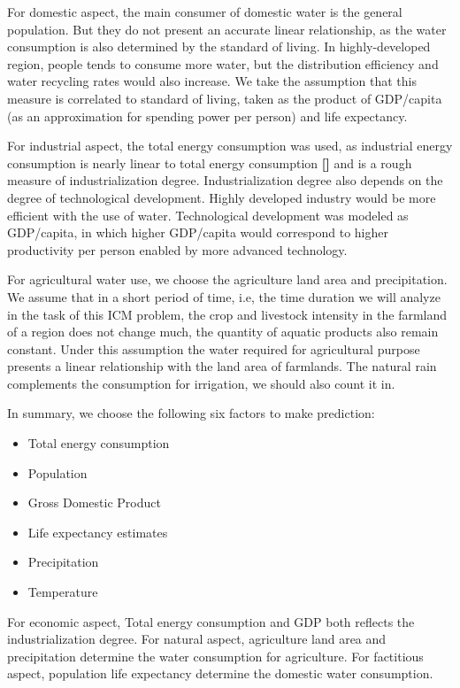 \documentclass{mcmthesis}
\begin{document}
For domestic aspect, the main consumer of domestic water is the general population. But they do not present an accurate linear relationship, as the water consumption is also determined by the standard of living. In highly-developed region, people tends to consume more water, but the distribution efficiency and water recycling rates would also increase. We take the assumption that this measure is correlated to standard of living, taken as the product of GDP/capita (as an approximation for spending power per person) and life expectancy. %

For industrial aspect, the total energy consumption was used, as industrial energy consumption is nearly linear to total energy consumption \textbf{[]} and is a rough measure of industrialization degree. Industrialization degree also depends on the degree of technological development. Highly developed industry would be more efficient with the use of water. Technological development was modeled as GDP/capita, in which higher GDP/capita would correspond to higher productivity per person enabled by more advanced technology.  %

For agricultural water use, we choose the agriculture land area and  precipitation. We assume that in a short period of time, i.e, the time duration we will analyze in the task of this ICM problem, the crop and livestock intensity in the farmland of a region does not change much, the quantity of aquatic products also remain constant. Under this assumption the water required for agricultural purpose presents a linear relationship with the land area of farmlands. The natural rain complements the consumption for irrigation, we should also count it in.

In summary, we choose the following six factors to make prediction:

\begin{itemize}
\item Total energy consumption
\item Population
\item Gross Domestic Product
\item Life expectancy estimates
\item Precipitation
\item Temperature
\end{itemize}

For economic aspect, Total energy consumption and GDP both reflects the industrialization degree. For natural aspect, agriculture land area and precipitation determine the water consumption for agriculture. For factitious aspect, population life expectancy determine the domestic water consumption. 
\end{document}
